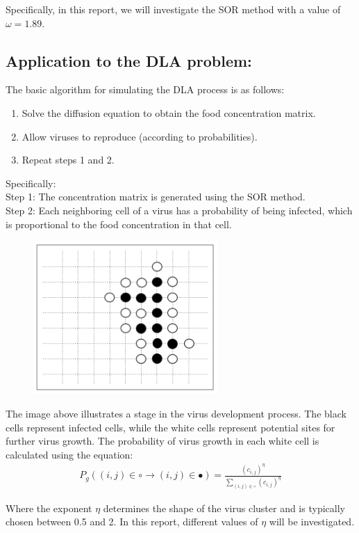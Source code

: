 \documentclass[a4paper,10pt,notitlepage]{article}
\begin{document}
{{{Specifically, in this report, we will investigate the SOR method with a value of $\omega=1.89$.
\subsection{Application to the DLA problem:}
    The basic algorithm for simulating the DLA process is as follows:
    \begin{enumerate}
        \item Solve the diffusion equation to obtain the food concentration matrix.
        \item Allow viruses to reproduce (according to probabilities).
        \item Repeat steps 1 and 2.
    \end{enumerate}
    Specifically:\\
    Step 1: The concentration matrix is generated using the SOR method.\\
Step 2: Each neighboring cell of a virus has a probability of being infected, which is proportional to the food concentration in that cell.\\
\vspace{0.5cm}
    \begin{figure}[h]
        \centering
        \includegraphics[width = 7cm]{img2.3.png}
    \end{figure}

    The image above illustrates a stage in the virus development process. The black cells represent infected cells, while
    the white cells represent potential sites for further virus growth.
The probability of virus growth in each white cell is calculated using the equation:
\begin{eqnarray}
    P_g((i,j) \in \circ \rightarrow (i,j)\in \bullet) = \frac{(c_{i,j})^\eta}{\displaystyle\sum_{(i,j)\in\circ}(c_{i,j})^\eta}
\end{eqnarray}

Where the exponent $\eta$ determines the shape of the virus cluster and is typically chosen between 0.5 and 2.
In this report, different values of $\eta$ will be investigated.

}}}
\end{document}
